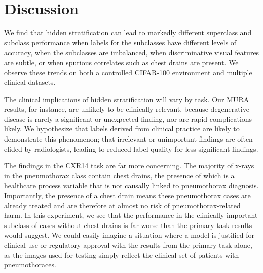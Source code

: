 \documentclass[sigconf]{acmart}
\begin{document}
%

\section{Discussion}
\label{sec:discussion}

We find that hidden stratification can lead to markedly different superclass and subclass performance when labels for the subclasses have different levels of accuracy, when the subclasses are imbalanced, when discriminative visual features are subtle, or when spurious correlates such as chest drains are present.
We observe these trends on both a controlled CIFAR-100 environment and multiple clinical datasets.

The clinical implications of hidden stratification will vary by task. 
Our MURA results, for instance, are unlikely to be clinically relevant, because degenerative disease is rarely a significant or unexpected finding, nor are rapid complications likely. 
We hypothesize that labels derived from clinical practice are likely to demonstrate this phenomenon; that irrelevant or unimportant findings are often elided by radiologists, leading to reduced label quality for less significant findings.

The findings in the CXR14 task are far more concerning. 
The majority of x-rays in the pneumothorax class contain chest drains, the presence of which is a healthcare process variable that is not causally linked to pneumothorax diagnosis.
 Importantly, the presence of a chest drain means these pneumothorax cases are already treated and are therefore at almost no risk of pneumothorax-related harm. 
 In this experiment, we see that the performance in the clinically important subclass of cases without chest drains is far worse than the primary task results would suggest. 
 We could easily imagine a situation where a model is justified for clinical use or regulatory approval with the results from the primary task alone, as the images used for testing simply reflect the clinical set of patients with pneumothoraces.
 
\end{document}
